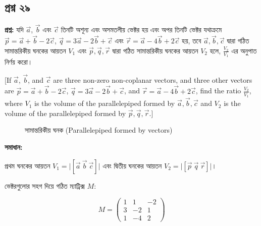\documentclass{article}
\begin{document}
\hrulefill

\subsection*{প্রশ্ন ২৯}
\textbf{প্রশ্ন:} যদি $\vec{a}$, $\vec{b}$ এবং $\vec{c}$ তিনটি অশূন্য এবং অসমতলীয় ভেক্টর হয় এবং অপর তিনটি ভেক্টর যথাক্রমে $\vec{p} = \vec{a} + \vec{b} - 2\vec{c}$, $\vec{q} = 3\vec{a} - 2\vec{b} + \vec{c}$ এবং $\vec{r} = \vec{a} - 4\vec{b} + 2\vec{c}$ হয়, তবে $\vec{a}, \vec{b}, \vec{c}$ দ্বারা গঠিত সামান্তরিকীয় ঘনকের আয়তন $V_1$ এবং $\vec{p}, \vec{q}, \vec{r}$ দ্বারা গঠিত সামান্তরিকীয় ঘনকের আয়তন $V_2$ হলে, $\frac{V_2}{V_1}$ এর অনুপাত নির্ণয় করো।

[If $\vec{a}$, $\vec{b}$, and $\vec{c}$ are three non-zero non-coplanar vectors, and three other vectors are $\vec{p} = \vec{a} + \vec{b} - 2\vec{c}$, $\vec{q} = 3\vec{a} - 2\vec{b} + \vec{c}$, and $\vec{r} = \vec{a} - 4\vec{b} + 2\vec{c}$, find the ratio $\frac{V_2}{V_1}$, where $V_1$ is the volume of the parallelepiped formed by $\vec{a}, \vec{b}, \vec{c}$ and $V_2$ is the volume of the parallelepiped formed by $\vec{p}, \vec{q}, \vec{r}$.]

\begin{figure}[h!]
\centering
{}
\caption{সামান্তরিকীয় ঘনক (Parallelepiped formed by vectors)}
\end{figure}

\textbf{সমাধান:}

প্রথম ঘনকের আয়তন $V_1 = \vert{}[\vec{a} \ \vec{b} \ \vec{c}]\vert{}$ এবং দ্বিতীয় ঘনকের আয়তন $V_2 = \vert{}[\vec{p} \ \vec{q} \ \vec{r}]\vert{}$।

ভেক্টরগুলোর সহগ দিয়ে গঠিত ম্যাট্রিক্স $M$:

$$M = \begin{pmatrix} 1 & 1 & -2 \\ 3 & -2 & 1 \\ 1 & -4 & 2 \end{pmatrix}$$
\end{document}
